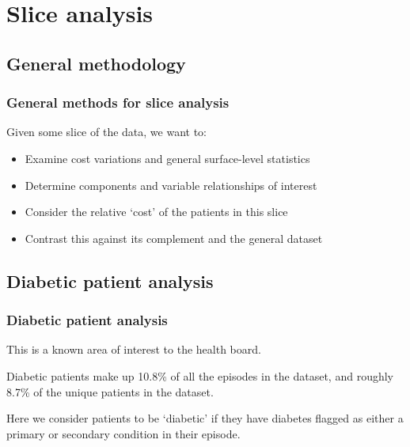 \documentclass{beamer}
\begin{document}
\section{Slice analysis}

\subsection{General methodology}

\begin{frame}
    \frametitle{General methods for slice analysis}

    Given some slice of the data, we want to:
    \begin{itemize}
        \item Examine cost variations and general surface-level statistics
        \item Determine components and variable relationships of interest
        \item Consider the relative `cost' of the patients in this slice
        \item Contrast this against its complement and the general dataset
    \end{itemize}
\end{frame}

\subsection{Diabetic patient analysis}

\begin{frame}
    \frametitle{Diabetic patient analysis}

    This is a known area of interest to the health board.

    \vspace{10pt}
    Diabetic patients make up 10.8\% of all the episodes in the dataset, and
    roughly 8.7\% of the unique patients in the dataset.

    \vspace{10pt}
    Here we consider patients to be `diabetic' if they have diabetes flagged as
    either a primary or secondary condition in their episode.
\end{frame}
\end{document}
